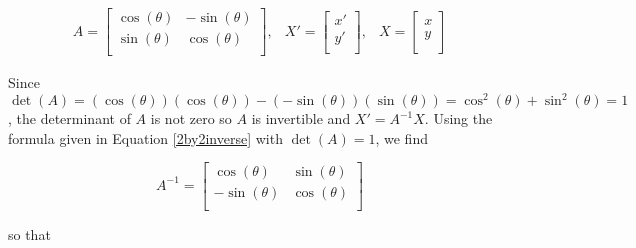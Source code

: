\vspace{-.05in}

\[ \begin{array}{ccc}

A = \left[ \begin{array}{rr} \cos(\theta) & -\sin(\theta) \\ \sin(\theta) & \cos(\theta) \\ \end{array} \right], 

&

X'= \left[ \begin{array}{c}x' \\ y'\\ \end{array} \right],

&

X= \left[ \begin{array}{c}x \\ y\\ \end{array} \right]


\end{array} \]

Since $\det(A) = (\cos(\theta))(\cos(\theta)) - (-\sin(\theta))(\sin(\theta)) = \cos^{2}(\theta) + \sin^{2}(\theta) = 1$, the determinant of $A$ is not zero so $A$ is invertible and  $X' = A^{-1}X$.  Using the  formula given in Equation \ref{2by2inverse} with $\det(A) = 1$, we find

\vspace{-.05in}

\[ A^{-1} = \left[ \begin{array}{rr} \cos(\theta) & \sin(\theta) \\ -\sin(\theta) & \cos(\theta) \\ \end{array} \right] \]

so that

